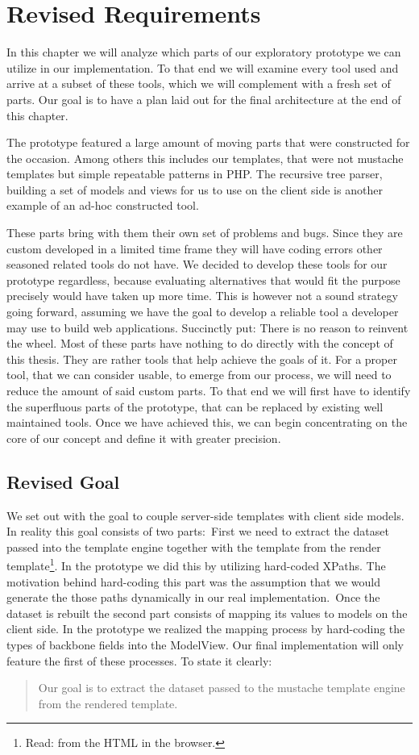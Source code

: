 \documentclass[thesis.tex]{subfiles}
\begin{document}
\chapter{Revised Requirements}
\label{chap:revised}
In this chapter we will analyze which parts of our exploratory prototype we can
utilize in our implementation. To that end we will examine every tool used and
arrive at a subset of these tools, which we will complement with a fresh set of
parts. Our goal is to have a plan laid out for the final architecture at the end
of this chapter.

The prototype featured a large amount of moving parts that were constructed for
the occasion. Among others this includes our templates, that were not mustache
templates but simple repeatable patterns in PHP. The recursive tree parser,
building a set of models and views for us to use on the client side is another
example of an ad-hoc constructed tool.

These parts bring with them their own set of problems and bugs.
Since they are custom developed in a limited time frame they will have coding
errors other seasoned related tools do not have.
We decided to develop these tools for our prototype regardless,
because evaluating alternatives that would fit the purpose precisely
would have taken up more time.
This is however not a sound strategy going forward, assuming we have the goal to
develop a reliable tool a developer may use to build web applications.
Succinctly put: There is no reason to reinvent the wheel.
Most of these parts have nothing to do directly with the concept of this thesis.
They are rather tools that help achieve the goals of it.
For a proper tool, that we can consider usable, to emerge from our process,
we will need to reduce the amount of said custom parts.
To that end we will first have to identify the superfluous parts of the
prototype, that can be replaced by existing well maintained tools. Once we have
achieved this, we can begin concentrating on the core of our concept and define
it with greater precision.

\section{Revised Goal}
\label{sec:revised-goal}
We set out with the goal to couple server-side templates with client side
models. In reality this goal consists of two parts:\
First we need to extract the dataset passed into the template engine together
with the template from the render template\footnote{Read: from the HTML in the browser.}.
In the prototype we did this by utilizing hard-coded XPaths. The motivation
behind hard-coding this part was the assumption that we would generate the those
paths dynamically in our real implementation.\
Once the dataset is rebuilt the second part consists of mapping its values
to models on the client side. In the prototype we realized the mapping process
by hard-coding the types of backbone fields into the ModelView.
Our final implementation will only feature the first of these processes.
To state it clearly:
\begin{quote}
Our goal is to extract the dataset passed to the mustache template engine from
the rendered template.
\end{quote}
\end{document}
